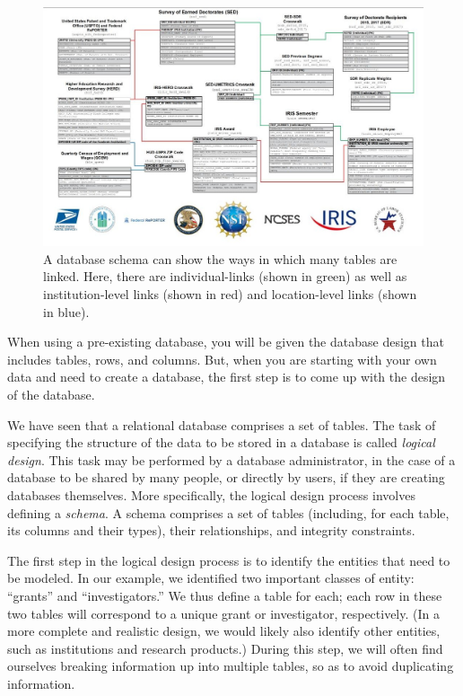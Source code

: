 \documentclass[]{krantz}
\begin{document}
\begin{figure}

{\centering \includegraphics[width=1\linewidth]{ChapterDB/figures/NCSES-Database-Diagram} 

}

\caption{A database schema can show the ways in which many tables are linked. Here, there are individual-links (shown in green) as well as institution-level links (shown in red) and location-level links (shown in blue).}\label{fig:NCSES}
\end{figure}

When using a pre-existing database, you will be given the database
design that includes tables, rows, and columns. But, when you are
starting with your own data and need to create a database, the first
step is to come up with the design of the database.

We have seen that a relational database comprises a set of tables. The
task of specifying the structure of the data to be stored in a database
is called \emph{logical design}. This task may be performed by a
database administrator, in the case of a database to be shared by many
people, or directly by users, if they are creating databases themselves.
More specifically, the logical design process involves defining a
\emph{schema}. A schema comprises a set of tables (including, for each
table, its columns and their types), their relationships, and integrity
constraints.

The first step in the logical design process is to identify the entities
that need to be modeled. In our example, we identified two important
classes of entity: ``grants'' and ``investigators.'' We thus define a
table for each; each row in these two tables will correspond to a unique
grant or investigator, respectively. (In a more complete and realistic
design, we would likely also identify other entities, such as
institutions and research products.) During this step, we will often
find ourselves breaking information up into multiple tables, so as to
avoid duplicating information.
\end{document}
